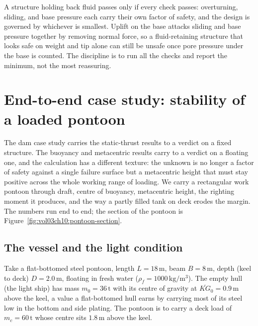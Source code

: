 \begin{principle}
A structure holding back fluid passes only if every check passes:
overturning, sliding, and base pressure each carry their own factor of
safety, and the design is governed by whichever is smallest. Uplift on
the base attacks sliding and base pressure together by removing normal
force, so a fluid-retaining structure that looks safe on weight and tip
alone can still be unsafe once pore pressure under the base is counted.
The discipline is to run all the checks and report the minimum, not the
most reassuring.
\end{principle}

\section{End-to-end case study: stability of a loaded pontoon}

The dam case study carries the static-thrust results to a verdict on a
fixed structure. The buoyancy and metacentric results carry to a verdict
on a floating one, and the calculation has a different texture: the
unknown is no longer a factor of safety against a single failure surface
but a metacentric height that must stay positive across the whole working
range of loading. We carry a rectangular work pontoon through draft,
centre of buoyancy, metacentric height, the righting moment it produces,
and the way a partly filled tank on deck erodes the margin. The numbers
run end to end; the section of the pontoon is
Figure~\ref{fig:vol03ch10:pontoon-section}.



\subsection{The vessel and the light condition}

Take a flat-bottomed steel pontoon, length $L = 18\,\si{\meter}$, beam
$B = 8\,\si{\meter}$, depth (keel to deck) $D = 2.0\,\si{\meter}$, floating
in fresh water ($\rho_f = 1000\,\si{\kilogram\per\meter\cubed}$). The empty
hull (the light ship) has mass $m_0 = 36\,\si{\tonne}$ with its centre of
gravity at $\overline{KG}_0 = 0.9\,\si{\meter}$ above the keel, a value a
flat-bottomed hull earns by carrying most of its steel low in the bottom
and side plating. The pontoon is to carry a deck load of $m_c =
60\,\si{\tonne}$ whose centre sits $1.8\,\si{\meter}$ above the keel.

